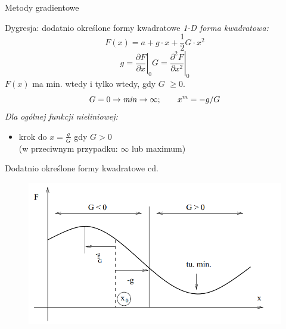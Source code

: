   \begin{frame}{Metody gradientowe}

    \begin{block}{Dygresja: dodatnio określone formy kwadratowe}
      \emph{1-D forma kwadratowa:}
	  \begin{equation}
	  	F(x) = a + g \cdot x + \frac{1}{2} G \cdot x^2
      \nonumber
	  \end{equation}
    \begin{equation}
      g = \left.\frac{\partial F}{\partial x}\right|_{0}
      G = \left.\frac{\partial^{2} F}{\partial x^2}\right|_{0}
      \nonumber
    \end{equation}
	  $F(x)$ ma min. wtedy i tylko wtedy, gdy $G$ $\geq 0$.
    \begin{equation}
	  		G = 0 \rightarrow \text{\emph{min}} \rightarrow \infty; \qquad
        x^m = -g/G
        \nonumber
	  \end{equation}
	  \emph{Dla ogólnej funkcji nieliniowej:}
	  \smallskip
	  \begin{itemize}
	  	    \item krok do $x = \frac{g}{G}$ gdy $G > 0$
	  	    \\(w przeciwnym przypadku: $\infty$ lub maximum)
	  \end{itemize}
	\end{block}

  \end{frame}

  \begin{frame}{Dodatnio określone formy kwadratowe cd.}

    \begin{figure}
		\centering
		\includegraphics[height=0.8\textheight ,width=1\textwidth]{img/17/dygresja}
	\end{figure}

  \end{frame}

